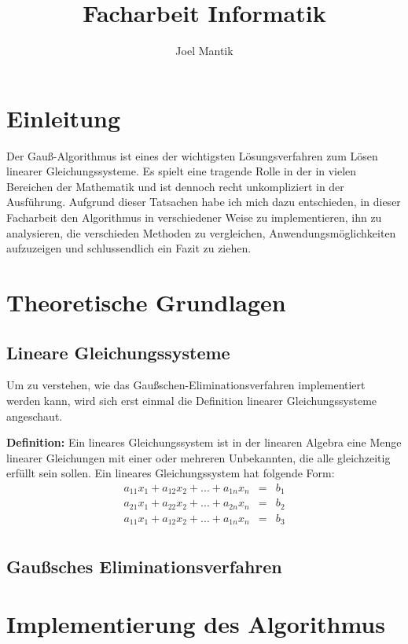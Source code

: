 \documentclass[a4paper, 12pt]{report}
\title{Facharbeit Informatik}
\author{Joel Mantik}
\begin{document}
\maketitle
\tableofcontents

\chapter{Einleitung}
Der Gauß-Algorithmus ist eines der wichtigsten Lösungsverfahren zum Lösen linearer Gleichungssysteme.
Es spielt eine tragende Rolle in der in vielen Bereichen der Mathematik und ist dennoch recht unkompliziert
in der Ausführung. Aufgrund dieser Tatsachen habe ich mich dazu entschieden, in dieser Facharbeit den Algorithmus in verschiedener Weise zu implementieren, ihn zu analysieren,
die verschieden Methoden zu vergleichen, Anwendungsmöglichkeiten aufzuzeigen und schlussendlich ein Fazit zu ziehen.

\chapter{Theoretische Grundlagen}
\section{Lineare Gleichungssysteme}
Um zu verstehen, wie das Gaußschen-Eliminationsverfahren implementiert werden kann, wird sich erst einmal
die Definition linearer Gleichungssysteme angeschaut.

\newline
\textbf{Definition:}
Ein lineares Gleichungssystem ist in der linearen Algebra eine Menge linearer Gleichungen mit einer oder mehreren
Unbekannten, die alle gleichzeitig erfüllt sein sollen.
\newline
Ein lineares Gleichungssystem hat folgende Form:
\begin{eqnarray}
    a_{11}x_{1}+ a_{12}x_{2}+...+ a_{1n}x_{n}     & = &  b_1\\
    a_{21}x_{1}+ a_{22}x_{2}+...+ a_{2n}x_{n}     & = &  b_2\\
    a_{11}x_{1}+ a_{12}x_{2}+...+ a_{1n}x_{n}     & = &  b_3\\
\end{eqnarray}
\section{Gaußsches Eliminationsverfahren}
\chapter{Implementierung des Algorithmus}
\end{document}
